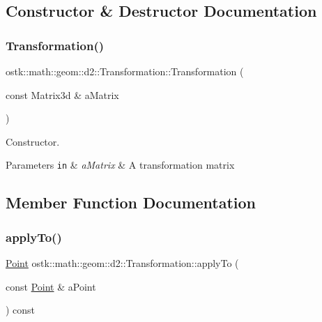 \subsection{Constructor \& Destructor Documentation}
\mbox{\label{classostk_1_1math_1_1geom_1_1d2_1_1_transformation_ae1bda9d4a0795afcafa3b0d750492cba}} 
\subsubsection{\texorpdfstring{Transformation()}{Transformation()}}
{\footnotesize\ttfamily ostk\+::math\+::geom\+::d2\+::\+Transformation\+::\+Transformation (\begin{DoxyParamCaption}\item[{const Matrix3d \&}]{a\+Matrix }\end{DoxyParamCaption})}



Constructor. 


\begin{DoxyParams}[1]{Parameters}
\mbox{\tt in}  & {\em a\+Matrix} & A transformation matrix \\
\hline
\end{DoxyParams}


\subsection{Member Function Documentation}
\mbox{\label{classostk_1_1math_1_1geom_1_1d2_1_1_transformation_a96728b260bab0f10c15dcaffff987834}} 
\subsubsection{\texorpdfstring{apply\+To()}{applyTo()}\hspace{0.1cm}{\footnotesize\ttfamily [1/3]}}
{\footnotesize\ttfamily \hyperlink{classostk_1_1math_1_1geom_1_1d2_1_1objects_1_1_point}{Point} ostk\+::math\+::geom\+::d2\+::\+Transformation\+::apply\+To (\begin{DoxyParamCaption}\item[{const \hyperlink{classostk_1_1math_1_1geom_1_1d2_1_1objects_1_1_point}{Point} \&}]{a\+Point }\end{DoxyParamCaption}) const}

